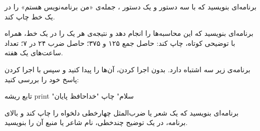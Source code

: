 \exercise برنامه‌ای بنویسید که با سه دستور  و یک دستور
، جمله‌ی «من برنامه‌نویس هستم» را در یک خط چاپ کند.

\exercise برنامه‌ای بنویسید که این محاسبه‌ها را انجام دهد و نتیجه‌ی هر یک
را در یک خط، همراه با توضیحی کوتاه، چاپ کند: حاصل جمع ۱۲۵ و ۳۷۵؛
حاصل ضرب ۲۴ در ۷؛ تعداد ساعت‌های یک هفته.

\exercise برنامه‌ی زیر سه اشتباه دارد. بدون اجرا کردن، آن‌ها را پیدا کنید و
سپس با اجرا کردن پاسخ خود را بررسی کنید:
\begin{salamfa}
تابع ریشه
    print "سلام"
    چاپ "خداحافظ
پایان
\end{salamfa}

\exercise برنامه‌ای بنویسید که یک شعر یا ضرب‌المثل چهارخطی دلخواه را چاپ
کند و بالای برنامه، در یک توضیح چندخطی، نام شاعر یا منبع آن را بنویسید.
